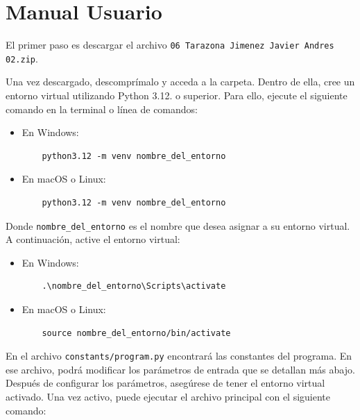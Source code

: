 \documentclass{article}
\begin{document}

\section{Manual Usuario}\label{sec:man_u}

El primer paso es descargar el archivo \texttt{06 Tarazona Jimenez Javier Andres 02.zip}.

Una vez descargado, descomprímalo y acceda a la carpeta. Dentro de ella, cree un 
entorno virtual utilizando Python 3.12. o superior. Para ello, ejecute el siguiente 
comando en 
la terminal o línea de comandos:

\begin{itemize}
  \item En Windows:
  \begin{verbatim}
    python3.12 -m venv nombre_del_entorno
  \end{verbatim}
  \item En macOS o Linux:
  \begin{verbatim}
    python3.12 -m venv nombre_del_entorno
  \end{verbatim}
\end{itemize}

Donde \texttt{nombre\_del\_entorno} es el nombre que desea asignar a su entorno virtual. 
A continuación, active el entorno virtual:

\begin{itemize}
  \item En Windows:
  \begin{verbatim}
    .\nombre_del_entorno\Scripts\activate
  \end{verbatim}
  \item En macOS o Linux:
  \begin{verbatim}
    source nombre_del_entorno/bin/activate
  \end{verbatim}
\end{itemize}

En el archivo \texttt{constants/program.py} encontrará las constantes del programa. 
En ese archivo, podrá modificar los parámetros de entrada que se detallan más abajo.\\

Después de configurar los parámetros, asegúrese de tener el entorno virtual activado. 
Una vez activo, puede ejecutar el archivo principal con el siguiente comando:
\end{document}
